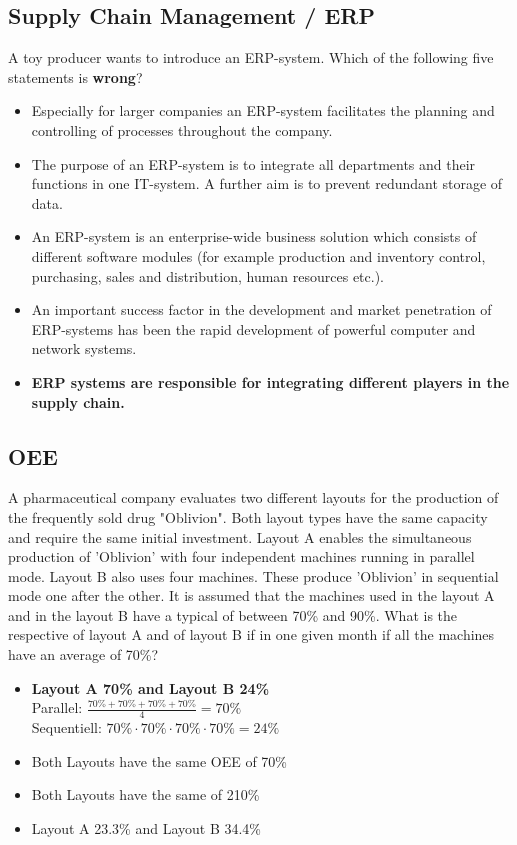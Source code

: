 \subsection{Supply Chain Management / ERP}
A toy producer wants to introduce an ERP-system. Which of the following five statements is
\textbf{wrong}?
\begin{itemize}
	\item Especially for larger companies an ERP-system facilitates the planning and controlling of
	processes throughout the company.
	\item The purpose of an ERP-system is to integrate all departments and their functions in one IT-system. A further aim is to prevent redundant storage of data. 
	\item An ERP-system is an enterprise-wide business solution which consists of different software modules (for example production and inventory control, purchasing, sales and distribution, human resources etc.).
	\item An important success factor in the development and market penetration of ERP-systems has been the rapid development of powerful computer and network systems.
	\item \textbf{ERP systems are responsible for integrating different players in the supply chain. }
\end{itemize}

\subsection{OEE}
A pharmaceutical company evaluates two different layouts for the production of the frequently sold drug "Oblivion". Both layout types have the same capacity and require the same initial investment.
Layout A enables the simultaneous production of 'Oblivion' with four independent machines running in parallel mode. Layout B also uses four machines. These produce 'Oblivion' in sequential mode one after the other. It is assumed that the machines used in the layout A and in the layout B have a typical  of between 70\% and 90\%.
What is the respective  of layout A and of layout B if in one given month if all the machines have an average  of 70\%?
\begin{itemize}
	\item \textbf{Layout A 70\% and Layout B 24\%}\\ Parallel: $\frac{70\%+70\%+70\%+70\%}{4} = 70\%$\\ Sequentiell: $70\%\cdot70\%\cdot70\%\cdot70\% = 24\%$
	\item Both Layouts have the same OEE of 70\%
	\item Both Layouts have the same  of 210\%
	\item Layout A 23.3\% and Layout B 34.4\%
\end{itemize}
